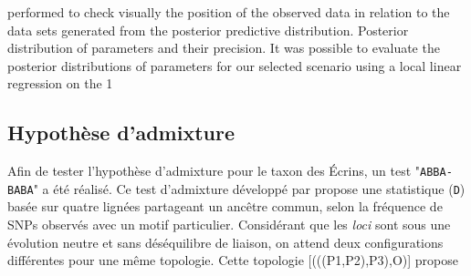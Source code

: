 performed to check visually the position of the observed data in relation to the data sets generated from the posterior predictive distribution. Posterior distribution of parameters and their precision. It was possible to evaluate the posterior distributions of parameters for our selected scenario using a local linear regression on the 1%

\subsection{Hypothèse d'admixture}


Afin de tester l'hypothèse d'admixture pour le taxon des Écrins, un test "\verb|ABBA-BABA|" a été réalisé. Ce test d'admixture développé par \citet{Durand2011} propose une statistique (\verb|D|) basée sur quatre lignées partageant un ancêtre commun, selon la fréquence de SNPs observés avec un motif particulier. 
 Considérant que les \textit{loci} sont sous une évolution neutre et sans déséquilibre de liaison, on attend deux configurations différentes pour une même topologie. Cette topologie [(((P1,P2),P3),O)] propose\DIFdelbegin {}\DIFdelend \DIFaddbegin {}\DIFaddend  
 
